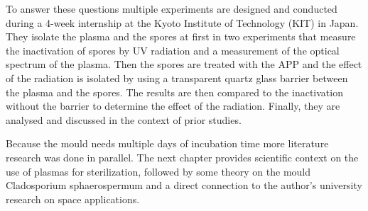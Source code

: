 To answer these questions multiple experiments are designed and conducted during a 4-week internship at the Kyoto Institute of Technology (KIT) in Japan. They isolate the plasma and the spores at first in two experiments that measure the inactivation of spores by UV radiation and a measurement of the optical spectrum of the plasma. Then the spores are treated with the APP and the effect of the radiation is isolated by using a transparent quartz glass barrier between the plasma and the spores. The results are then compared to the inactivation without the barrier to determine the effect of the radiation. Finally, they are analysed and discussed in the context of prior studies.

Because the mould needs multiple days of incubation time more literature research was done in parallel. The next chapter provides scientific context on the use of plasmas for sterilization, followed by some theory on the mould Cladosporium sphaerospermum and a direct connection to the author's university research on space applications.